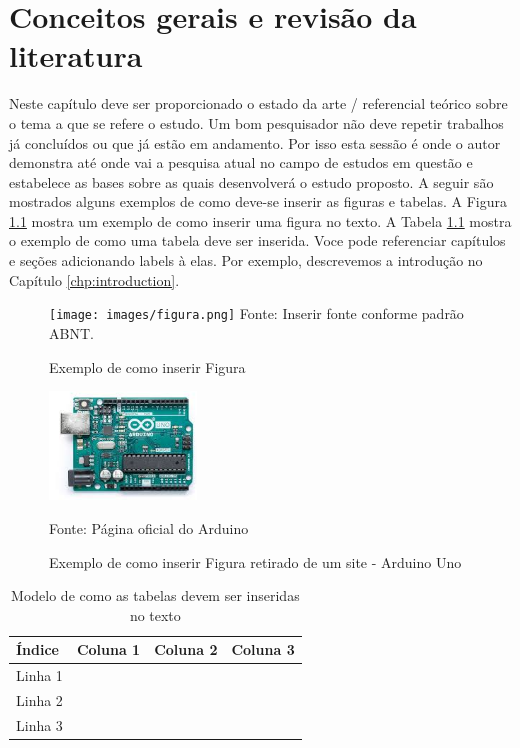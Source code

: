 \chapter{Conceitos gerais e revisão da literatura}
Neste capítulo deve ser proporcionado o estado da arte / referencial teórico
sobre o tema a que se refere o estudo. Um bom pesquisador não deve repetir
trabalhos já concluídos ou que já estão em andamento. Por isso esta sessão é
onde o autor demonstra até onde vai a pesquisa atual no campo de estudos em
questão e estabelece as bases sobre as quais desenvolverá o estudo proposto. A
seguir são mostrados alguns exemplos de como deve-se inserir as figuras e
tabelas. A Figura \ref{fig:exemplo} mostra um exemplo de como inserir uma
figura no texto. A Tabela \ref{tb:exemplo} mostra o exemplo de como uma tabela
deve ser inserida.  Voce pode referenciar capítulos e seções adicionando labels
à elas. Por exemplo, descrevemos a introdução no Capítulo
\ref{chp:introduction}.

\begin{figure}[!htb]
    \centering
    \caption{Exemplo de como inserir Figura}
    \texttt{[image: images/figura.png]}
    {\footnotesize Fonte: Inserir fonte conforme padrão ABNT.}
    \label{fig:exemplo}
\end{figure}



\newpage

\begin{figure}[!htb]
    \centering
    \caption{Exemplo de como inserir Figura retirado de um site - Arduino Uno}
    \includegraphics[width=0.35\textwidth]{images/uno.png}

    {\footnotesize Fonte: Página oficial do Arduino\protect\footnotemark}
    \label{fig:arduino_uno}
\end{figure}

\begin{table}[htb]
\caption{Modelo de como as tabelas devem ser inseridas no texto}
\label{tb:exemplo}
\centering
\begin{tabular}{|l|c|r|r|} %
\hline
Índice  & Coluna 1 & Coluna 2 & Coluna 3 \\
\hline
Linha 1 &          &          &          \\
Linha 2 &          &          &          \\
Linha 3 &          &          &          \\
\hline
\end{tabular}
\end{table}
